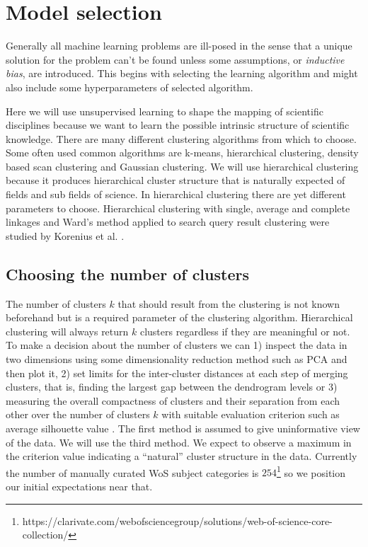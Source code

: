 \section{Model selection}
Generally all machine learning problems are ill-posed in the sense 
that a unique solution for the problem can't be found unless some
assumptions, or \emph{inductive bias}, are introduced. This begins 
with selecting the learning algorithm and might also include some
hyperparameters of selected algorithm.

Here we will use unsupervised learning to shape the mapping of 
scientific disciplines because we want to learn the possible 
intrinsic structure of scientific knowledge.  
There are many different clustering algorithms from which to 
choose. Some often used common algorithms are k-means, hierarchical
clustering, density based scan clustering and Gaussian clustering.
We will use hierarchical clustering because it produces 
hierarchical cluster structure that is naturally expected of 
fields and sub fields of science.
In hierarchical clustering there are yet different parameters to 
choose. 
Hierarchical clustering with single, average and complete linkages
and Ward's method applied to search query result clustering were 
studied by Korenius et al. \cite{korenius_hierarchical_2006}.

\subsection{Choosing the number of clusters}
The number of clusters $k$ that should result from the clustering is
not known beforehand but is a required parameter of the
clustering algorithm. Hierarchical clustering will always return 
$k$ clusters regardless if they are meaningful or not. To make a
decision about the number of clusters we can 1) inspect the data in 
two dimensions using some dimensionality reduction method such as 
PCA and then plot it, 2) set limits for the inter-cluster 
distances at each step of merging clusters, that is, finding the 
largest gap between the dendrogram levels or 3) measuring the 
overall compactness of clusters and their separation from each 
other over the number of clusters $k$ with suitable evaluation
criterion such as average silhouette value 
\cite{alpaydin2004introduction}\cite{calinski_dendrite_1974}\cite{rousseeuw_silhouettes:_1987}.
The first method is assumed to give uninformative view of the 
data. We will use the third method. We expect to observe a maximum
in the criterion value indicating a ``natural'' cluster structure
in the data. Currently the number of manually curated WoS subject
categories is $254$\footnote{https://clarivate.com/webofsciencegroup/solutions/web-of-science-core-collection/} 
so we position our initial expectations near that.





